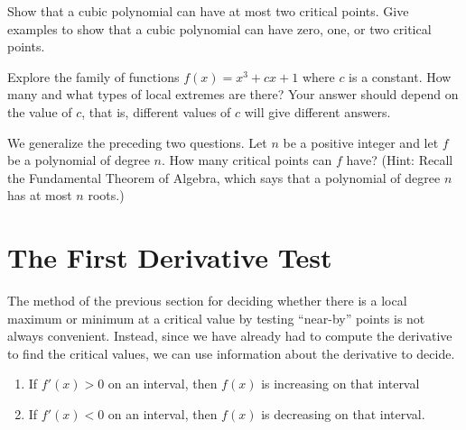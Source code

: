 \begin{exercises}
\begin{exercise} Show that a cubic polynomial can have at most two critical
points. Give examples to show that a cubic polynomial can have zero,
one, or two critical points.
\end{exercise}

\begin{exercise} Explore the family of functions $f(x) = x^3 + cx +1$ where $c$
 is a constant.  How many and what types of local extremes are there?
 Your answer should depend on the value of $c$, that is, different
 values of $c$ will give different answers.
\end{exercise}

\begin{exercise} We generalize the preceding two questions. Let $n$ be a
positive integer and let $f$ be a polynomial of degree $n$. How many
critical points can $f$ have? (Hint: Recall the {\dfont Fundamental
  Theorem of Algebra}, 
which says that a polynomial of degree $n$ has
  at most $n$ roots.)
\end{exercise}

\end{exercises}









\section{The First Derivative Test}

The method of the previous section for deciding whether there is a
local maximum or minimum at a critical value by testing ``near-by''
points is not always convenient. Instead, since we have already had to
compute the derivative to find the critical values, we can use
information about the derivative to decide.

\begin{mainTheorem}\hfil
\begin{enumerate}
\item If $f'(x) >0$ on an interval, then $f(x)$ is increasing on that interval
\item If $f'(x) <0$ on an interval, then $f(x)$ is decreasing on that interval.
\end{enumerate}
\end{mainTheorem}


